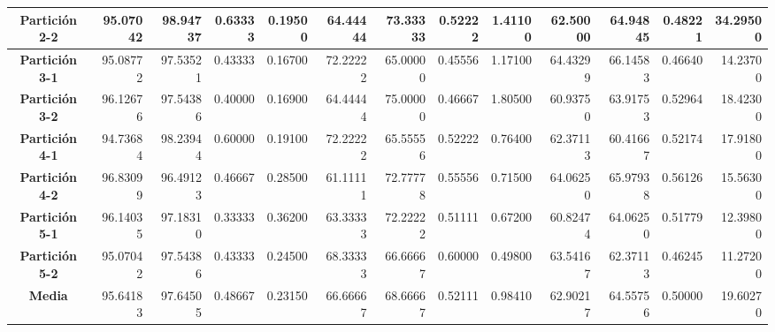 \documentclass[a4paper,11pt]{article}
\begin{document}
\begin{table}[H]
\begin{adjustbox}{width=1.1\textwidth}
\begin{tabular}{|c|r|r|r|r|r|r|r|r|r|r|r|r|}
    \textbf{Partición 2-2} & 95.07042 & 98.94737 & 0.63333 & 0.19500 & 64.44444 & 73.33333 & 0.52222 & 1.41100 & 62.50000 & 64.94845 & 0.48221 & 34.29500 \\ \hline
    \textbf{Partición 3-1} & 95.08772 & 97.53521 & 0.43333 & 0.16700 & 72.22222 & 65.00000 & 0.45556 & 1.17100 & 64.43299 & 66.14583 & 0.46640 & 14.23700 \\ \hline
    \textbf{Partición 3-2} & 96.12676 & 97.54386 & 0.40000 & 0.16900 & 64.44444 & 75.00000 & 0.46667 & 1.80500 & 60.93750 & 63.91753 & 0.52964 & 18.42300 \\ \hline
    \textbf{Partición 4-1} & 94.73684 & 98.23944 & 0.60000 & 0.19100 & 72.22222 & 65.55556 & 0.52222 & 0.76400 & 62.37113 & 60.41667 & 0.52174 & 17.91800 \\ \hline
    \textbf{Partición 4-2} & 96.83099 & 96.49123 & 0.46667 & 0.28500 & 61.11111 & 72.77778 & 0.55556 & 0.71500 & 64.06250 & 65.97938 & 0.56126 & 15.56300 \\ \hline
    \textbf{Partición 5-1} & 96.14035 & 97.18310 & 0.33333 & 0.36200 & 63.33333 & 72.22222 & 0.51111 & 0.67200 & 60.82474 & 64.06250 & 0.51779 & 12.39800 \\ \hline
    \textbf{Partición 5-2} & 95.07042 & 97.54386 & 0.43333 & 0.24500 & 68.33333 & 66.66667 & 0.60000 & 0.49800 & 63.54167 & 62.37113 & 0.46245 & 11.27200 \\ \hline
    \textbf{Media} & 95.64183 & 97.64505 & 0.48667 & 0.23150 & 66.66667 & 68.66667 & 0.52111 & 0.98410 & 62.90217 & 64.55756 & 0.50000 & 19.60270 \\ \hline
    \end{tabular}
    \end{adjustbox}
    \label{BL}
  \end{table}  
\end{document}
